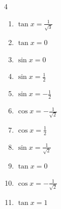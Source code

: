 \begin{multicols}{4}
\begin{enumerate}
  \item $\displaystyle \tan{x}  = \frac{1}{\sqrt{3}}$


  \item $\displaystyle \tan{x}  = 0$

        \phantom{$\displaystyle x = 0 , \pi$}

  \item $\displaystyle \sin{x}  = 0$

        \phantom{$\displaystyle x = 0 , \pi$}

\columnbreak %

  \item $\displaystyle \sin{x}  = \frac{1}{2}$


  \item $\displaystyle \sin{x}  = -\frac{1}{2}$


  \item $\displaystyle \cos{x}  = -\frac{1}{\sqrt{2}}$


  \item $\displaystyle \cos{x}  = \frac{1}{2}$


  \item $\displaystyle \sin{x}  = \frac{1}{\sqrt{2}}$


  \item $\displaystyle \tan{x}  = 0$

        \phantom{$\displaystyle x = 0 , \pi$}

  \item $\displaystyle \cos{x}  = -\frac{1}{\sqrt{2}}$


  \item $\displaystyle \tan{x}  = 1$



\end{enumerate}
\end{multicols}
